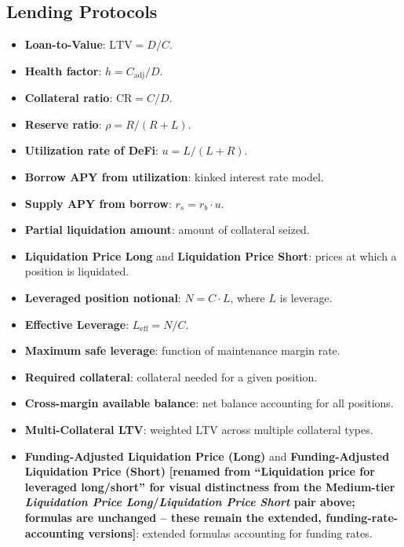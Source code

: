 \documentclass[twoside,11pt]{article}
\begin{document}
\subsection{Lending Protocols}\label{subsec:lending-protocols}
\label{sec:bench_lending}

\begin{itemize}
  \item \textbf{Loan-to-Value}: $\mathrm{LTV} = D/C$.
  \item \textbf{Health factor}: $h = C_{\mathrm{adj}} / D$.
  \item \textbf{Collateral ratio}: $\mathrm{CR} = C/D$.
  \item \textbf{Reserve ratio}: $\rho = R / (R + L)$.
  \item \textbf{Utilization rate of DeFi}: $u = L / (L + R)$.
  \item \textbf{Borrow APY from utilization}: kinked interest rate model.
  \item \textbf{Supply APY from borrow}: $r_s = r_b \cdot u$.
  \item \textbf{Partial liquidation amount}: amount of collateral seized.
  \item \textbf{Liquidation Price Long} and \textbf{Liquidation Price Short}:
    prices at which a position is liquidated.
  \item \textbf{Leveraged position notional}: $N = C \cdot L$, where $L$ is leverage.
  \item \textbf{Effective Leverage}: $L_{\mathrm{eff}} = N/C$.
  \item \textbf{Maximum safe leverage}: function of maintenance margin rate.
  \item \textbf{Required collateral}: collateral needed for a given position.
  \item \textbf{Cross-margin available balance}: net balance accounting for all positions.
  \item \textbf{Multi-Collateral LTV}: weighted LTV across multiple collateral types.
  \item \textbf{Funding-Adjusted Liquidation Price (Long)} and
    \textbf{Funding-Adjusted Liquidation Price (Short)} \textbf{[renamed
    from ``Liquidation price for leveraged long/short'' for visual
    distinctness from the Medium-tier \emph{Liquidation Price
    Long}/\emph{Liquidation Price Short} pair above; formulas are
    unchanged -- these remain the extended, funding-rate-accounting
    versions]}: extended formulas accounting for funding rates.
\end{itemize}
\end{document}
